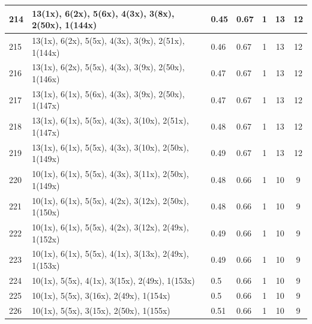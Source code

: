 \begin{small}
\begin{longtable}{|p{0.5cm}|p{9cm}|p{1.3cm}|p{1.3cm}|c|c|c|}
  214 & 13(1x), 6(2x), 5(6x), 4(3x), 3(8x), 2(50x), 1(144x) & \cellcolor{colorGood}  0.45 & \cellcolor{colorGood} 0.67 & 1 & 13 & \cellcolor{colorGood} 12 \\   \hline
  215 & 13(1x), 6(2x), 5(5x), 4(3x), 3(9x), 2(51x), 1(144x) & \cellcolor{colorGood}  0.46 & \cellcolor{colorGood} 0.67 & 1 & 13 & \cellcolor{colorGood} 12 \\   \hline
  216 & 13(1x), 6(2x), 5(5x), 4(3x), 3(9x), 2(50x), 1(146x) & \cellcolor{colorGood}  0.47 & \cellcolor{colorGood} 0.67 & 1 & 13 & \cellcolor{colorGood} 12 \\   \hline
  217 & 13(1x), 6(1x), 5(6x), 4(3x), 3(9x), 2(50x), 1(147x) & \cellcolor{colorGood}  0.47 & \cellcolor{colorGood} 0.67 & 1 & 13 & \cellcolor{colorGood} 12 \\   \hline
  218 & 13(1x), 6(1x), 5(5x), 4(3x), 3(10x), 2(51x), 1(147x) & \cellcolor{colorGood}  0.48 & \cellcolor{colorGood} 0.67 & 1 & 13 & \cellcolor{colorGood} 12 \\   \hline
  219 & 13(1x), 6(1x), 5(5x), 4(3x), 3(10x), 2(50x), 1(149x) & \cellcolor{colorGood}  0.49 & \cellcolor{colorGood} 0.67 & 1 & 13 & \cellcolor{colorGood} 12 \\   \hline
  220 & 10(1x), 6(1x), 5(5x), 4(3x), 3(11x), 2(50x), 1(149x) & \cellcolor{colorGood}  0.48 & \cellcolor{colorGood} 0.66 & 1 & 10 & \cellcolor{colorGood} 9 \\   \hline
  221 & 10(1x), 6(1x), 5(5x), 4(2x), 3(12x), 2(50x), 1(150x) & \cellcolor{colorGood}  0.48 & \cellcolor{colorGood} 0.66 & 1 & 10 & \cellcolor{colorGood} 9 \\   \hline
  222 & 10(1x), 6(1x), 5(5x), 4(2x), 3(12x), 2(49x), 1(152x) & \cellcolor{colorGood}  0.49 & \cellcolor{colorGood} 0.66 & 1 & 10 & \cellcolor{colorGood} 9 \\   \hline
  223 & 10(1x), 6(1x), 5(5x), 4(1x), 3(13x), 2(49x), 1(153x) & \cellcolor{colorGood}  0.49 & \cellcolor{colorGood} 0.66 & 1 & 10 & \cellcolor{colorGood} 9 \\   \hline
  224 & 10(1x), 5(5x), 4(1x), 3(15x), 2(49x), 1(153x) & \cellcolor{colorGood}  0.5 & \cellcolor{colorGood} 0.66 & 1 & 10 & \cellcolor{colorGood} 9 \\   \hline
  225 & 10(1x), 5(5x), 3(16x), 2(49x), 1(154x) & \cellcolor{colorGood}  0.5 & \cellcolor{colorGood} 0.66 & 1 & 10 & \cellcolor{colorGood} 9 \\   \hline
  226 & 10(1x), 5(5x), 3(15x), 2(50x), 1(155x) & \cellcolor{colorGood}  0.51 & \cellcolor{colorGood} 0.66 & 1 & 10 & \cellcolor{colorGood} 9 \\   \hline

\end{longtable}
\end{small}
